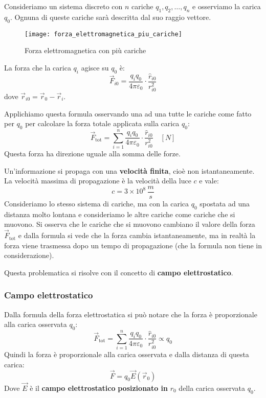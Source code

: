 \documentclass[a4paper]{article}
\begin{document}
Consideriamo un sistema discreto con \( n \) cariche \( q_1, q_2, \ldots, q_n \) e osserviamo
la carica \( q_0 \). Ognuna di queste cariche sarà descritta dal suo raggio vettore.
\begin{figure}[H]
  \centering
  \texttt{[image: forza\_elettromagnetica\_piu\_cariche]}
  \caption{Forza elettromagnetica con più cariche}
\end{figure}
\noindent
La forza che la carica \( q_i \) agisce su \( q_0 \) è:
\[
  \vec{F}_{i0} = \frac{q_i q_0}{4 \pi \varepsilon_0} \cdot \frac{\hat{r}_{i0}}{r_{i0}^2}
\] 
dove \( \vec{r}_{i0} = \vec{r}_0 - \vec{r}_i \).

Applichiamo questa formula osservando una ad una tutte le cariche come fatto per \( q_0 \)
per calcolare la forza totale applicata sulla carica \( q_0 \):
\[
  \vec{F}_{\text{tot}} = \sum_{i=1}^{n} \frac{q_i q_0}{4 \pi \varepsilon_0} \cdot 
  \frac{\hat{r}_{i0}}{r_{i0}^2} \quad \left[ N \right]
\] 
Questa forza ha direzione uguale alla somma delle forze.

\vspace{1em}
\noindent
Un'informazione si propaga con una \textbf{velocità finita}, cioè non istantaneamente. La
velocità massima di propagazione è la velocità della luce \( c \) e vale:
\[
  c = 3 \times 10^8 \, \frac{m}{s}
\]
Consideriamo lo stesso sistema di cariche, ma con la carica \( q_0 \) spostata ad una
distanza molto lontana e consideriamo le altre cariche come cariche che si muovono.
Si osserva che le cariche che si muovono cambiano il valore della forza 
\( \vec{F}_{\text{tot}} \) e dalla formula si vede che la forza cambia istantaneamente, 
ma in realtà la forza viene trasmessa dopo un tempo di propagazione (che la formula non 
tiene in considerazione).

Questa problematica si risolve con il concetto di \textbf{campo elettrostatico}.

\subsubsection{Campo elettrostatico}
Dalla formula della forza elettrostatica si può notare che la forza è proporzionale
alla carica osservata \( q_0 \):
\[
  \vec{F}_{\text{tot}} = \sum_{i=1}^{n} \frac{q_i q_0}{4 \pi \varepsilon_0} \cdot
  \frac{\hat{r}_{i0}}{r_{i0}^2} \propto q_0
\] 
Quindi la forza è proporzionale alla carica osservata e dalla distanza di questa carica:
\[
  \vec{F} = q_0 \vec{E} \left( \vec{r}_0 \right) 
\] 
Dove \( \vec{E} \) è il \textbf{campo elettrostatico} \textbf{posizionato in } \( r_0 \)
della carica osservata \( q_0 \).
\end{document}
